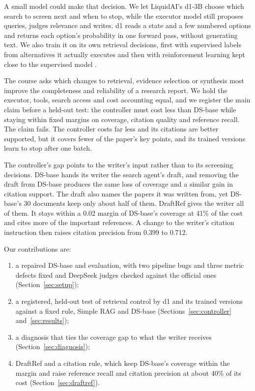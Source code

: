\documentclass[11pt, letterpaper]{article}
\begin{document}
A small model could make that decision. We let LiquidAI's d1-3B \cite{liquidai2026d1} choose which
search to screen next and when to stop, while the executor model still proposes queries, judges
relevance and writes. d1 reads a state and a few numbered options and returns each option's
probability in one forward pass, without generating text. We also train it on its own retrieval
decisions, first with supervised labels from alternatives it actually executes and then with
reinforcement learning kept close to the supervised model \cite{shao2024deepseekmath}.

The course asks which changes to retrieval, evidence selection or synthesis most improve the
completeness and reliability of a research report. We hold the executor, tools, search access and
cost accounting equal, and we register the main claim before a held-out test: the controller must
cost less than DS-base while staying within fixed margins on coverage, citation quality and
reference recall. The claim fails. The controller costs far less and its citations are better
supported, but it covers fewer of the paper's key points, and its trained versions learn to stop
after one batch.

The controller's gap points to the writer's input rather than to its screening decisions. DS-base
hands its writer the search agent's draft, and removing the draft from DS-base produces the same
loss of coverage and a similar gain in citation support. The draft also names the papers it was
written from, yet DS-base's 30 documents keep only about half of them. DraftRef gives the writer all
of them. It stays within a 0.02 margin of DS-base's coverage at 41\% of the cost and cites more of
the important references. A change to the writer's citation instruction then raises citation
precision from 0.399 to 0.712.

Our contributions are:
\begin{enumerate}
  \item a repaired DS-base and evaluation, with two pipeline bugs and three metric defects fixed and
  DeepSeek judges checked against the official ones (Section~\ref{sec:setup});
  \item a registered, held-out test of retrieval control by d1 and its trained versions against a
  fixed rule, Simple RAG and DS-base (Sections~\ref{sec:controller} and~\ref{sec:results});
  \item a diagnosis that ties the coverage gap to what the writer receives (Section~\ref{sec:diagnosis});
  \item DraftRef and a citation rule, which keep DS-base's coverage within the margin and raise
  reference recall and citation precision at about 40\% of its cost (Section~\ref{sec:draftref}).
\end{enumerate}
\end{document}
